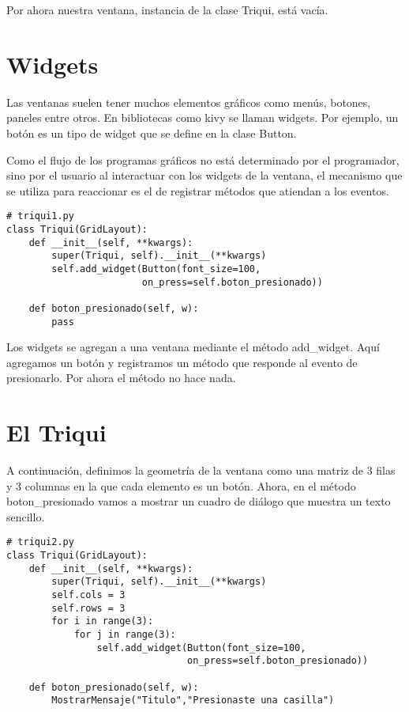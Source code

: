 Por ahora nuestra ventana, instancia de la clase Triqui, está vacía.

\section{Widgets}
Las ventanas suelen tener muchos elementos gráficos como menús, botones, paneles
entre otros. En bibliotecas como kivy se llaman widgets. Por 
ejemplo, un botón es un tipo de widget que  se define en la clase Button.

Como el flujo de los programas gráficos no está determinado por el programador,
sino por el usuario al interactuar con los widgets de la ventana, el mecanismo
que se utiliza para reaccionar es el de registrar métodos que atiendan a los eventos.

\beforeverb
\begin{verbatim}
# triqui1.py
class Triqui(GridLayout):
    def __init__(self, **kwargs):
        super(Triqui, self).__init__(**kwargs)
        self.add_widget(Button(font_size=100, 
                        on_press=self.boton_presionado))
    
    def boton_presionado(self, w):
        pass

\end{verbatim}
\afterverb

Los widgets se agregan a una ventana mediante el método add\_widget. Aquí agregamos
un botón y registramos un método que responde al evento de presionarlo. Por ahora 
el método no hace nada.

\section{El Triqui}

A continuación, definimos la geometría de la ventana como una matriz de 3 filas 
y 3 columnas en la que cada elemento es un botón. Ahora, en el método boton\_presionado
vamos a mostrar un cuadro de diálogo que muestra un texto sencillo.

\beforeverb
\begin{verbatim}
# triqui2.py
class Triqui(GridLayout):
    def __init__(self, **kwargs):
        super(Triqui, self).__init__(**kwargs)
        self.cols = 3
        self.rows = 3
        for i in range(3):
            for j in range(3):
                self.add_widget(Button(font_size=100, 
                                on_press=self.boton_presionado))
        
    def boton_presionado(self, w):
        MostrarMensaje("Titulo","Presionaste una casilla")

\end{verbatim}
\afterverb

